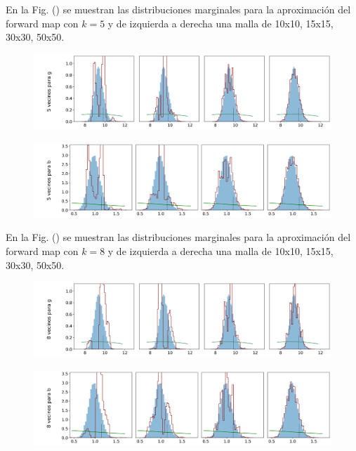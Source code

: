 En la Fig. () se muestran las distribuciones marginales para la aproximación del forward map con $k = 5$ y de izquierda a derecha una malla de 10x10, 15x15, 30x30, 50x50.

\begin{figure}[H] 
    \centering 
    \includegraphics[width = 16 cm ]{img/Exp_Central_gravedad_Sigma/Figuras/Generales/Convergencia_theta1_2_gravedad_sigma.png} 
\end{figure} 

\begin{figure}[H] 
    \centering 
    \includegraphics[width = 16 cm ]{img/Exp_Central_gravedad_Sigma/Figuras/Generales/Convergencia_theta2_2_gravedad_sigma.png} 
\end{figure} 

En la Fig. () se muestran las distribuciones marginales para la aproximación del forward map con $k = 8$ y de izquierda a derecha una malla de 10x10, 15x15, 30x30, 50x50.

\begin{figure}[H] 
    \centering 
    \includegraphics[width = 16 cm ]{img/Exp_Central_gravedad_Sigma/Figuras/Generales/Convergencia_theta1_3_gravedad_sigma.png} 
\end{figure} 

\begin{figure}[H] 
    \centering 
    \includegraphics[width = 16 cm ]{img/Exp_Central_gravedad_Sigma/Figuras/Generales/Convergencia_theta2_3_gravedad_sigma.png} 
\end{figure} 

